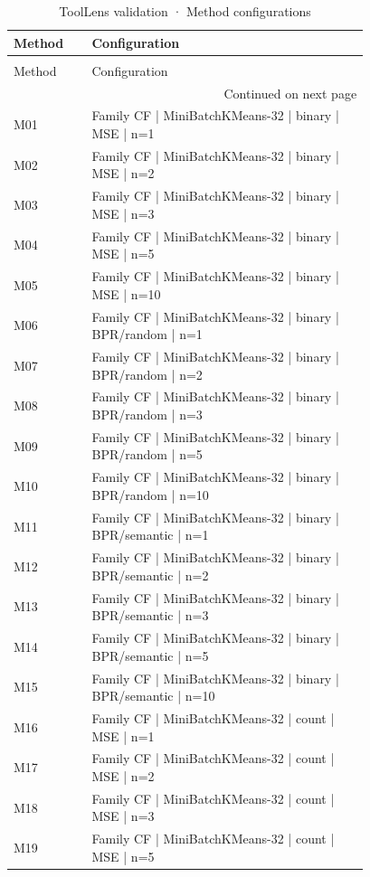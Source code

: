 \begin{longtable}{lp{0.78\linewidth}}
\caption{ToolLens validation · Method configurations} \label{tab:ToolLens-validation-validation-family-methods} \\
\toprule
Method & Configuration \\
\midrule
\endfirsthead
\caption[]{ToolLens validation · Method configurations} \\
\toprule
Method & Configuration \\
\midrule
\endhead
\midrule
\multicolumn{2}{r}{Continued on next page} \\
\midrule
\endfoot
\bottomrule
\endlastfoot
M01 & Family CF | MiniBatchKMeans-32 | binary | MSE | n=1 \\
M02 & Family CF | MiniBatchKMeans-32 | binary | MSE | n=2 \\
M03 & Family CF | MiniBatchKMeans-32 | binary | MSE | n=3 \\
M04 & Family CF | MiniBatchKMeans-32 | binary | MSE | n=5 \\
M05 & Family CF | MiniBatchKMeans-32 | binary | MSE | n=10 \\
M06 & Family CF | MiniBatchKMeans-32 | binary | BPR/random | n=1 \\
M07 & Family CF | MiniBatchKMeans-32 | binary | BPR/random | n=2 \\
M08 & Family CF | MiniBatchKMeans-32 | binary | BPR/random | n=3 \\
M09 & Family CF | MiniBatchKMeans-32 | binary | BPR/random | n=5 \\
M10 & Family CF | MiniBatchKMeans-32 | binary | BPR/random | n=10 \\
M11 & Family CF | MiniBatchKMeans-32 | binary | BPR/semantic | n=1 \\
M12 & Family CF | MiniBatchKMeans-32 | binary | BPR/semantic | n=2 \\
M13 & Family CF | MiniBatchKMeans-32 | binary | BPR/semantic | n=3 \\
M14 & Family CF | MiniBatchKMeans-32 | binary | BPR/semantic | n=5 \\
M15 & Family CF | MiniBatchKMeans-32 | binary | BPR/semantic | n=10 \\
M16 & Family CF | MiniBatchKMeans-32 | count | MSE | n=1 \\
M17 & Family CF | MiniBatchKMeans-32 | count | MSE | n=2 \\
M18 & Family CF | MiniBatchKMeans-32 | count | MSE | n=3 \\
M19 & Family CF | MiniBatchKMeans-32 | count | MSE | n=5 \\

\end{longtable}
